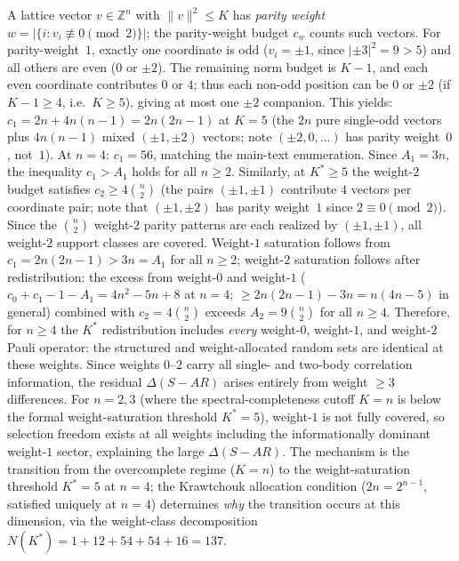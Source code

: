 \documentclass[twocolumn,prx,aps,superscriptaddress,longbibliography]{revtex4-2}
\begin{document}
A lattice vector $v \in \mathbb{Z}^n$ with $\lVert v\rVert^2 \leq K$
has \emph{parity weight} $w = |\{i : v_i \not\equiv 0 \pmod{2}\}|$;
the parity-weight budget $c_w$ counts such vectors.
For parity-weight~$1$, exactly one coordinate is odd
($v_i = \pm 1$, since $|\pm 3|^2 = 9 > 5$) and all others
are even ($0$ or $\pm 2$).  The remaining norm budget is
$K - 1$, and each even coordinate contributes $0$ or $4$;
thus each non-odd position can be $0$ or $\pm 2$ (if
$K - 1 \geq 4$, i.e.\ $K \geq 5$), giving at most one
$\pm 2$ companion.  This yields:
$c_1 = 2n + 4n(n{-}1) = 2n(2n{-}1)$ at $K = 5$
(the $2n$ pure single-odd vectors plus $4n(n{-}1)$ mixed
$(\pm 1, \pm 2)$ vectors; note $(\pm 2, 0, \ldots)$ has
parity weight~$0$, not~$1$).
At $n = 4$: $c_1 = 56$, matching the main-text enumeration.
Since $A_1 = 3n$, the inequality $c_1 > A_1$ holds for all
$n \geq 2$.
Similarly, at $K^* \geq 5$ the weight-$2$ budget satisfies
$c_2 \geq 4\binom{n}{2}$
(the pairs $(\pm 1, \pm 1)$ contribute $4$ vectors per
coordinate pair; note that $(\pm 1, \pm 2)$ has
parity weight~$1$ since $2 \equiv 0 \pmod{2}$).
Since the $\binom{n}{2}$ weight-$2$ parity patterns are
each realized by $(\pm 1, \pm 1)$, all weight-$2$ support
classes are covered.
Weight-$1$ saturation follows from
$c_1 = 2n(2n{-}1) > 3n = A_1$ for all $n \geq 2$;
weight-$2$ saturation follows after redistribution:
the excess from weight-$0$ and weight-$1$
($c_0 + c_1 - 1 - A_1 = 4n^2 - 5n + 8$ at $n = 4$;
$\geq 2n(2n{-}1) - 3n = n(4n{-}5)$ in general)
combined with $c_2 = 4\binom{n}{2}$ exceeds
$A_2 = 9\binom{n}{2}$ for all $n \geq 4$.
Therefore, for $n \geq 4$ the $K^*$ redistribution includes
\emph{every} weight-$0$, weight-$1$, and weight-$2$ Pauli operator:
the structured and weight-allocated random sets are identical at these
weights.  Since weights $0$--$2$ carry all single- and two-body
correlation information, the residual $\Delta(S{-}AR)$ arises entirely
from weight $\geq 3$ differences.
For $n = 2, 3$ (where the spectral-completeness cutoff
$K = n$ is below the formal weight-saturation threshold
$K^* = 5$), weight-$1$ is not
fully covered, so selection freedom exists at all
weights including the informationally dominant weight-$1$ sector,
explaining the large $\Delta(S{-}AR)$.
The mechanism is the transition from the overcomplete
regime ($K = n$) to the weight-saturation threshold
$K^* = 5$ at $n = 4$; the Krawtchouk allocation condition
($2n = 2^{n-1}$, satisfied uniquely at $n = 4$) determines
\emph{why} the transition occurs at this dimension, via the
weight-class decomposition
$N(K^*) = 1 + 12 + 54 + 54 + 16 = 137$.
\end{document}
